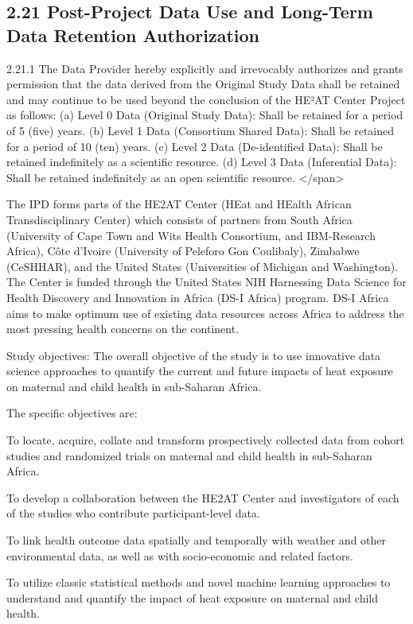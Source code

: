 \documentclass[12pt,letterpaper]{article}
\begin{document}
\subsection*{2.21 Post-Project Data Use and Long-Term Data Retention Authorization}

2.21.1 The Data Provider hereby explicitly and irrevocably authorizes and grants permission that the data derived from the Original Study Data shall be retained and may continue to be used beyond the conclusion of the HE²AT Center Project as follows: (a) Level 0 Data (Original Study Data): Shall be retained for a period of 5 (five) years. (b) Level 1 Data (Consortium Shared Data): Shall be retained for a period of 10 (ten) years. (c) Level 2 Data (De-identified Data): Shall be retained indefinitely as a scientific resource. (d) Level 3 Data (Inferential Data): Shall be retained indefinitely as an open scientific resource. </span>

The IPD forms parts of the HE2AT Center (HEat and HEalth African Transdisciplinary Center) which consists of partners from South Africa (University of Cape Town and Wits Health Consortium, and IBM-Research Africa), Côte d’Ivoire (University of Peleforo Gon Coulibaly), Zimbabwe (CeSHHAR), and the United States (Universities of Michigan and Washington). The Center is funded through the United States NIH Harnessing Data Science for Health Discovery and Innovation in Africa (DS-I Africa) program. DS-I Africa aims to make optimum use of existing data resources across Africa to address the most pressing health concerns on the continent.

Study objectives: The overall objective of the study is to use innovative data science approaches to quantify the current and future impacts of heat exposure on maternal and child health in sub-Saharan Africa.

The specific objectives are:

To locate, acquire, collate and transform prospectively collected data from cohort studies and randomized trials on maternal and child health in sub-Saharan Africa.

To develop a collaboration between the HE2AT Center and investigators of each of the studies who contribute participant-level data.

To link health outcome data spatially and temporally with weather and other environmental data, as well as with socio-economic and related factors.

To utilize classic statistical methods and novel machine learning approaches to understand and quantify the impact of heat exposure on maternal and child health.
\end{document}
